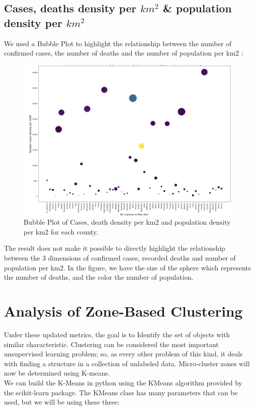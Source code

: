 \documentclass{article}
\begin{document}
\subsection{Cases, deaths density per $km^{2}$  \& population density per $km^{2}$}
We used a Bubble Plot  to highlight the relationship between the number of confirmed cases,  the number of deaths and the number of population per km2 :
\begin{figure}[h!]
 \centering
\includegraphics[width=1.06\textwidth]{compare5.png}
 \caption{Bubble Plot of Cases,  death density per km2 and population density per km2 for each county.}
\end{figure}

The result does not make it possible to directly highlight the relationship between the 3 dimensions of confirmed cases, recorded deaths and number of population per km2. In the figure, we have the size of the sphere which represents the number of deaths, and the color the number of population.

\section{Analysis of Zone-Based Clustering}
Under these updated metrics,  the goal is to Identify the set of objects with similar characteristic.  Clustering can be considered the most important unsupervised learning problem; so, as every other problem of this
kind, it deals with finding a structure in a collection of unlabeled data.
Micro-cluster zones will now be determined using K-means.\\

We can build the K-Means in python using the KMeans algorithm provided by the scikit-learn package. The KMeans class has many parameters that can be used, but we will be using these three:
\end{document}
